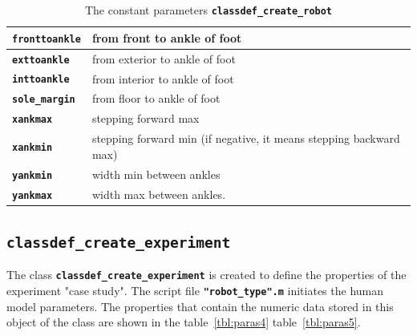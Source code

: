 \documentclass[12pt,oneside,notitlepage,abstracton,a4paper]{scrartcl}
\begin{document}
\begin{table}[!htbp]
\begin{center}
\begin{tabular}{|l|l|}
  \textbf{\texttt{fronttoankle}}          & from front to ankle of foot\\ \hline
  \textbf{\texttt{exttoankle}}          & from exterior to ankle of foot\\ \hline
  \textbf{\texttt{inttoankle}}          & from interior to ankle of foot\\ \hline
  \textbf{\texttt{sole\_margin}}          & from floor to ankle of foot  \\ \hline
  \textbf{\texttt{xankmax}}          & stepping forward max\\ \hline
  \textbf{\texttt{xankmin}}          & stepping forward min (if negative, it means stepping backward max)\\ \hline
  \textbf{\texttt{yankmin}}          & width min between ankles\\ \hline 
 \textbf{\texttt{yankmax}}         & width max between ankles.\\ \hline  
\end{tabular}
\caption {The constant parameters \textbf{\texttt{classdef\_create\_robot}}}
\label{tbl:paras3}
\end{center}
\end{table}
 

\subsection{\textbf{\texttt{classdef\_create\_experiment}}} \label{cls_create_experiment}   
The class \textbf{\texttt{classdef\_create\_experiment}} is created to define the properties of the experiment "case study". The script file \textbf{\texttt{"robot\_type".m}} initiates the human model parameters. The properties that contain the numeric data stored in this object of the class are shown in the table~\ref{tbl:paras4} table~\ref{tbl:paras5}.
  
\end{document}
